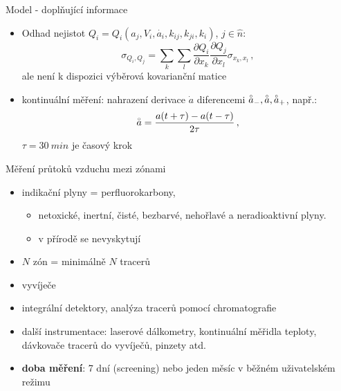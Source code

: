 \documentclass[10pt]{beamer}
\begin{document}
\begin{frame}{Model - doplňující informace}
    \small
    \begin{itemize}
        \item Odhad nejistot $Q_i=Q_i(a_j, V_i, \dot{a_i}, k_{ij}, k_{ji}, k_i)$, $j\in\hat{n}$:
            \begin{equation}
                \sigma_{Q_i,Q_j}=\sum_k\sum_l\frac{\partial Q_i}{\partial x_k}\frac{\partial Q_j}{\partial x_l}\sigma_{x_k,x_l}\,,
                \label{eq:cov_matrix}
            \end{equation}
            ale není k dispozici výběrová kovarianční matice
        \item kontinuální měření: nahrazení derivace $\dot{a}$ diferencemi $\accentset{\circ}{a}_-, \accentset{\circ}{a}, \accentset{\circ}{a}_+$, např.:
            \begin{equation}
                \accentset{\circ}{a}=\frac{a(t+\tau)-a(t-\tau)}{2\tau}\,,
                \label{eq:centralni_diference}
            \end{equation}
            $\tau=\SI{30}{min}$ je časový krok
    \end{itemize}
\end{frame}

\begin{frame}{Měření průtoků vzduchu mezi zónami}
    \small
    \begin{itemize}
        \item indikační plyny = perfluorokarbony,
            \begin{itemize}
                \item netoxické, inertní, čisté, bezbarvé, nehořlavé a neradioaktivní plyny. 
                \item v přírodě se nevyskytují
            \end{itemize}
        \item $N$ zón = minimálně $N$ tracerů
        \item vyvíječe
        \item integrální detektory, analýza tracerů pomocí chromatografie
        \item další instrumentace: laserové dálkometry, kontinuální měřidla teploty, dávkovače tracerů do vyvíječů, pinzety atd.
        \item \textbf{doba měření}: 7 dní (screening) nebo jeden měsíc v běžném uživatelském režimu
            
    \end{itemize}
\end{frame}
\end{document}
